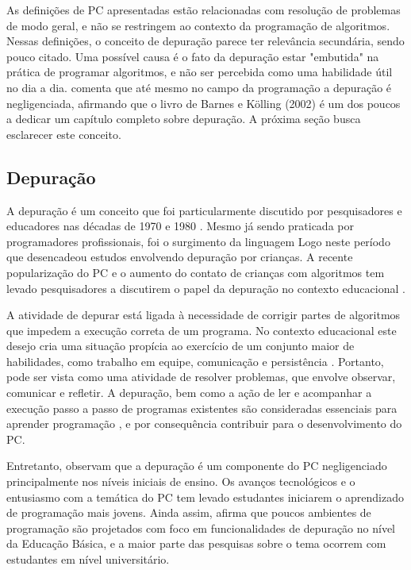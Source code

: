 As definições de PC apresentadas estão relacionadas com resolução de problemas de modo geral, e não se restringem ao contexto da programação de algoritmos. Nessas definições, o conceito de depuração parece ter relevância secundária, sendo pouco citado. Uma possível causa é o fato da depuração estar "embutida" na prática de programar algoritmos, e não ser percebida como uma habilidade útil no dia a dia.  comenta que até mesmo no campo da programação a depuração é negligenciada, afirmando que o livro de Barnes e Kölling (2002) é um dos poucos a dedicar um capítulo completo sobre depuração. A próxima seção busca esclarecer este conceito.

\subsection{Depuração}

A depuração é um conceito que foi particularmente discutido por pesquisadores e educadores nas décadas de 1970 \cite{mccauley_debugging_2008} e 1980 \cite{sipitakiat_robo-blocks_2012}. Mesmo já sendo praticada por programadores profissionais, foi o surgimento da linguagem Logo neste período que desencadeou estudos envolvendo depuração por crianças. A recente popularização do PC \cite{ilic_publication_2018} e o aumento do contato de crianças com algoritmos tem levado pesquisadores a discutirem o papel da depuração no contexto educacional \cite{repiso_robotics_2019}.

A atividade de depurar está ligada à necessidade de corrigir partes de algoritmos que impedem a execução correta de um programa. No contexto educacional este desejo cria uma situação propícia ao exercício de um conjunto maior de habilidades, como trabalho em equipe, comunicação e persistência \cite{sipitakiat_robo-blocks_2012}. Portanto, pode ser vista como uma atividade de resolver problemas, que envolve observar, comunicar e refletir. A depuração, bem como a ação de ler e acompanhar a execução passo a passo de programas existentes são consideradas essenciais para aprender programação \cite{mccauley_debugging_2008}, e por consequência contribuir para o desenvolvimento do \ac{PC}.

Entretanto,  observam que a depuração é um componente do PC negligenciado principalmente nos níveis iniciais de ensino. Os avanços tecnológicos e o entusiasmo com a temática do PC tem levado estudantes iniciarem o aprendizado de programação mais jovens. Ainda assim, afirma que poucos ambientes de programação são projetados com foco em funcionalidades de depuração no nível da Educação Básica, e a maior parte das pesquisas sobre o tema ocorrem com estudantes em nível universitário.

